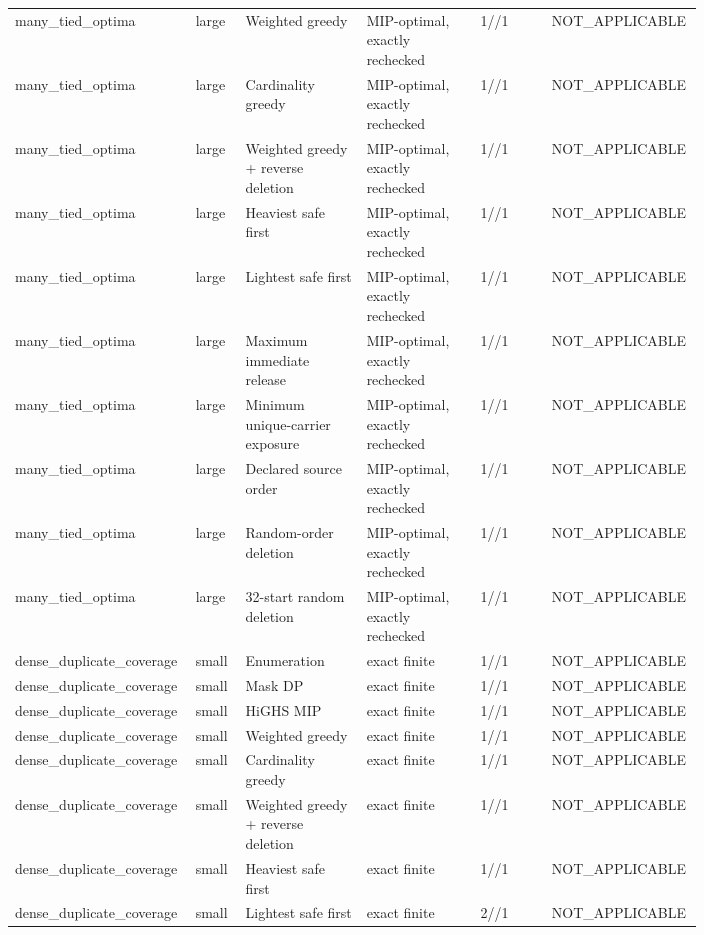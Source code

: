 {\begin{longtable}{p{0.18\linewidth}p{0.07\linewidth}p{0.17\linewidth}p{0.16\linewidth}p{0.10\linewidth}p{0.12\linewidth}}
many\_tied\_optima & large & Weighted greedy & MIP-optimal, exactly rechecked & 1//1 & NOT\_APPLICABLE \\
many\_tied\_optima & large & Cardinality greedy & MIP-optimal, exactly rechecked & 1//1 & NOT\_APPLICABLE \\
many\_tied\_optima & large & Weighted greedy + reverse deletion & MIP-optimal, exactly rechecked & 1//1 & NOT\_APPLICABLE \\
many\_tied\_optima & large & Heaviest safe first & MIP-optimal, exactly rechecked & 1//1 & NOT\_APPLICABLE \\
many\_tied\_optima & large & Lightest safe first & MIP-optimal, exactly rechecked & 1//1 & NOT\_APPLICABLE \\
many\_tied\_optima & large & Maximum immediate release & MIP-optimal, exactly rechecked & 1//1 & NOT\_APPLICABLE \\
many\_tied\_optima & large & Minimum unique-carrier exposure & MIP-optimal, exactly rechecked & 1//1 & NOT\_APPLICABLE \\
many\_tied\_optima & large & Declared source order & MIP-optimal, exactly rechecked & 1//1 & NOT\_APPLICABLE \\
many\_tied\_optima & large & Random-order deletion & MIP-optimal, exactly rechecked & 1//1 & NOT\_APPLICABLE \\
many\_tied\_optima & large & 32-start random deletion & MIP-optimal, exactly rechecked & 1//1 & NOT\_APPLICABLE \\
dense\_duplicate\_coverage & small & Enumeration & exact finite & 1//1 & NOT\_APPLICABLE \\
dense\_duplicate\_coverage & small & Mask DP & exact finite & 1//1 & NOT\_APPLICABLE \\
dense\_duplicate\_coverage & small & HiGHS MIP & exact finite & 1//1 & NOT\_APPLICABLE \\
dense\_duplicate\_coverage & small & Weighted greedy & exact finite & 1//1 & NOT\_APPLICABLE \\
dense\_duplicate\_coverage & small & Cardinality greedy & exact finite & 1//1 & NOT\_APPLICABLE \\
dense\_duplicate\_coverage & small & Weighted greedy + reverse deletion & exact finite & 1//1 & NOT\_APPLICABLE \\
dense\_duplicate\_coverage & small & Heaviest safe first & exact finite & 1//1 & NOT\_APPLICABLE \\
dense\_duplicate\_coverage & small & Lightest safe first & exact finite & 2//1 & NOT\_APPLICABLE \\

\end{longtable}}
